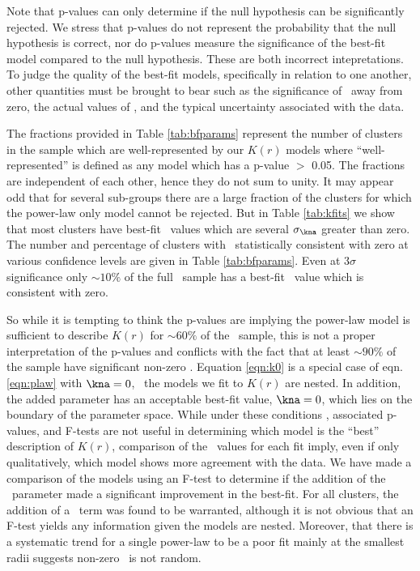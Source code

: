 Note that p-values can only determine if the null hypothesis can be
significantly rejected. We stress that p-values do not represent the
probability that the null hypothesis is correct, nor do p-values
measure the significance of the best-fit model compared to the null
hypothesis. These are both incorrect intepretations. To judge the
quality of the best-fit models, specifically in relation to one
another, other quantities must be brought to bear such as the
significance of \kna\ away from zero, the actual values of \chisq, and
the typical uncertainty associated with the data.

The fractions provided in Table \ref{tab:bfparams} represent the
number of clusters in the sample which are well-represented by our
$K(r)$ models where ``well-represented'' is defined as any model which
has a p-value $>$ 0.05. The fractions are independent of each other,
hence they do not sum to unity. It may appear odd that for several
sub-groups there are a large fraction of the clusters for which the
power-law only model cannot be rejected. But in Table \ref{tab:kfits}
we show that most clusters have best-fit \kna\ values which are
several $\sigma_{\kna}$ greater than zero. The number and percentage
of clusters with \kna\ statistically consistent with zero at various
confidence levels are given in Table \ref{tab:bfparams}. Even at
$3\sigma$ significance only $\sim10\%$ of the full \accept\ sample has
a best-fit \kna\ value which is consistent with zero.

So while it is tempting to think the p-values are implying the
power-law model is sufficient to describe $K(r)$ for $\sim60\%$ of the
\accept\ sample, this is not a proper interpretation of the p-values
and conflicts with the fact that at least $\sim 90\%$ of the sample
have significant non-zero \kna. Equation \ref{eqn:k0} is a special
case of eqn. \ref{eqn:plaw} with $\kna = 0$, \eg\ the models we fit to
$K(r)$ are nested. In addition, the added parameter has an acceptable
best-fit value, $\kna = 0$, which lies on the boundary of the
parameter space. While under these conditions \chisq, associated
p-values, and F-tests are not useful in determining which model is the
``best'' description of $K(r)$, comparison of the \chisq\ values for
each fit imply, even if only qualitatively, which model shows more
agreement with the data. We have made a comparison of the models using
an F-test to determine if the addition of the \kna\ parameter made a
significant improvement in the best-fit. For all clusters, the
addition of a \kna\ term was found to be warranted, although it is not
obvious that an F-test yields any information given the models are
nested.  Moreover, that there is a systematic trend for a single
power-law to be a poor fit mainly at the smallest radii suggests
non-zero \kna\ is not random.

